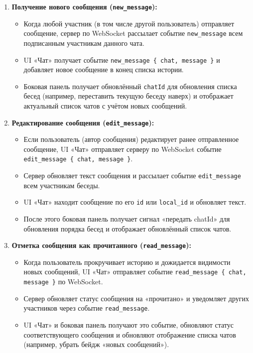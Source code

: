 \begin{enumerate}
    \item \textbf{Получение нового сообщения (\texttt{new\_message}):}
    \begin{itemize}
        \item Когда любой участник (в том числе другой пользователь) отправляет сообщение, сервер по WebSocket рассылает событие \texttt{new\_message} всем подписанным участникам данного чата.
        \item UI «Чат» получает событие \texttt{new\_message \{ chat, message \}} и добавляет новое сообщение в конец списка истории.
        \item Боковая панель получает обновлённый \texttt{chatId} для обновления списка бесед (например, переставить текущую беседу наверх) и отображает актуальный список чатов с учётом новых сообщений.
    \end{itemize}

    \item \textbf{Редактирование сообщения (\texttt{edit\_message}):}
    \begin{itemize}
        \item Если пользователь (автор сообщения) редактирует ранее отправленное сообщение, UI «Чат» отправляет серверу по WebSocket событие \texttt{edit\_message \{ chat, message \}}.
        \item Сервер обновляет текст сообщения и рассылает событие \texttt{edit\_message} всем участникам беседы.
        \item UI «Чат» находит сообщение по его \texttt{id} или \texttt{local\_id} и обновляет текст.
        \item После этого боковая панель получает сигнал «передать chatId» для обновления порядка бесед и отображает обновлённый список чатов.
    \end{itemize}

    \item \textbf{Отметка сообщения как прочитанного (\texttt{read\_message}):}
    \begin{itemize}
        \item Когда пользователь прокручивает историю и дожидается видимости новых сообщений, UI «Чат» отправляет событие \texttt{read\_message \{ chat, message \}} по WebSocket.
        \item Сервер обновляет статус сообщения на «прочитано» и уведомляет других участников через событие \texttt{read\_message}.
        \item UI «Чат» и боковая панель получают это событие, обновляют статус соответствующего сообщения и обновляют отображение списка чатов (например, убрать бейдж «новых сообщений»).
    \end{itemize}


\end{enumerate}
